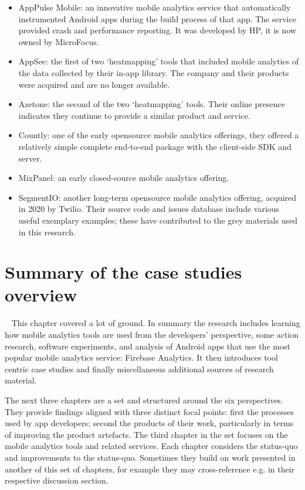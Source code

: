 \begin{itemize}
    \item AppPulse Mobile: an innovative mobile analytics service that automatically instrumented Android apps during the build process of that app. The service provided crash and performance reporting. It was developed by HP, it is now owned by MicroFocus. 
    \item AppSee: the first of two `heatmapping' tools that included mobile analytics of the data collected by their in-app library. The company and their products were acquired and are no longer available.
    \item Azetone: the second of the two `heatmapping' tools. Their online presence indicates they continue to provide a similar product and service.
    \item Countly: one of the early opensource mobile analytics offerings, they offered a relatively simple complete end-to-end package with the client-side SDK and server.
    \item MixPanel: an early closed-source mobile analytics offering.
    \item SegmentIO: another long-term opensource mobile analytics offering, acquired in 2020 by Twilio. Their source code and issues database include various useful exemplary examples; these have contributed to the grey materials used in this research. 
\end{itemize}



\section{Summary of the case studies overview}~\label{case-study-overview-summary}
This chapter covered a lot of ground. In summary the research includes learning how mobile analytics tools are used from the developers' perspective, some action research, software experiments, and analysis of Android apps that use the most popular mobile analytics service: Firebase Analytics. It then introduces tool centric case studies and finally miscellaneous additional sources of research material.

The next three chapters are a set and structured around the six perspectives. They provide findings aligned with three distinct focal points: first the processes used by app developers; second the products of their work, particularly in terms of improving the product artefacts. The third chapter in the set focuses on the mobile analytics tools and related services. Each chapter considers the status-quo and improvements to the status-quo. Sometimes they build on work presented in another of this set of chapters, for example they may cross-reference e.g. in their respective discussion section.

